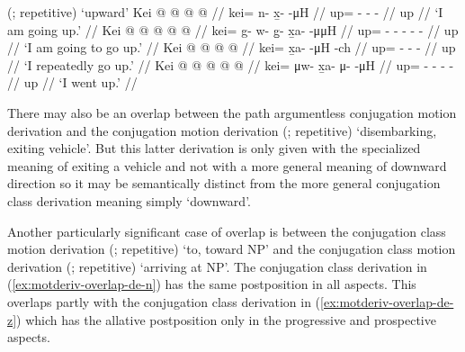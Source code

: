 \documentclass[12pt,letterpaper,oneside,article]{memoir}
\begin{document}
\pex\label{ex:motderiv-overlap-kei-z}%
\a\label{ex:motderiv-overlap-kei-z-motderiv}%
%
	 (;  repetitive) ‘upward’
\a\label{ex:motderiv-overlap-kei-z-prog}%
%
\begingl
	\gla	Kei @  @ {} @ {} @ {} //
	\glb	kei= n- x̱-  -μH //
	\glc	up= - -  - //
	\gld	up\•  {} {} {} //
	\glft	‘I am going up.’
		//
\endgl
\a\label{ex:motderiv-overlap-kei-z-prosp}%
%
\begingl
	\gla	Kei  @ {} @ {} @ {} @ {} @ {} //
	\glb	kei= g- w- g̱- x̱a-  -μμH //
	\glc	up= - - - -  - //
	\gld	up\•  {} {} {} {} {} //
	\glft	‘I am going to go up.’
		//
\endgl
\a\label{ex:motderiv-overlap-nopath-z-repimpfv}%
%
\begingl
	\gla	Kei @  @ {} @ {} @ {} //
	\glb	kei= x̱a-  -μH -ch //
	\glc	up= -  - - //
	\gld	up\•  {} {} {} //
	\glft	‘I repeatedly go up.’
		//
\endgl
\a\label{ex:motderiv-overlap-kei-z-pfv}%
%
\begingl
	\gla	Kei @  @ {} @ {} @ {} @ {} //
	\glb	kei= μw- x̱a- μ-  -μH //
	\glc	up= - - -  - //
	\gld	up  {} {} {} {} //
	\glft	‘I went up.’
		//
\endgl
\xe

There may also be an overlap between the path argumentless  conjugation motion derivation and the  conjugation motion derivation  (;  repetitive) ‘disembarking, exiting vehicle’.
But this latter derivation is only given with the specialized meaning of exiting a vehicle and not with a more general meaning of downward direction \parencite[297]{leer:1991} so it may be semantically distinct from the more general  conjugation class derivation meaning simply ‘downward’.

Another particularly significant case of overlap is between the  conjugation class motion derivation  (;  repetitive) ‘to, toward NP’ and the  conjugation class motion derivation  (;  repetitive) ‘arriving at NP’.
The  conjugation class derivation in (\ref{ex:motderiv-overlap-de-n}) has the same postposition in all aspects.
This overlaps partly with the  conjugation class derivation in (\ref{ex:motderiv-overlap-de-z}) which has the allative postposition  only in the progressive and prospective aspects.
\end{document}
